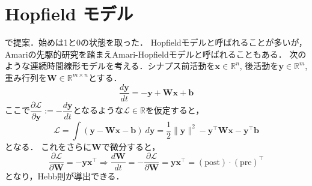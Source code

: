 \section{Hopfield モデル}\cite{Hopfield1982-vu}で提案．始めは1と0の状態を取った．
Hopfieldモデルと呼ばれることが多いが，Amariの先駆的研究\cite{Amari1972-fq}を踏まえAmari-Hopfieldモデルと呼ばれることもある．
次のような連続時間線形モデルを考える．シナプス前活動を$\mathbf{x}\in \mathbb{R}^n$, 後活動を$\mathbf{y}\in \mathbb{R}^m$, 重み行列を$\mathbf{W}\in \mathbb{R}^{m\times n}$とする．
$$
\frac{d\mathbf{y}}{dt}=-\mathbf{y}+\mathbf{W}\mathbf{x}+\mathbf{b}
$$
ここで$\dfrac{\partial\mathcal{L}}{\partial\mathbf{y}}:=-\dfrac{d\mathbf{y}}{dt}$となるような$\mathcal{L}\in \mathbb{R}$を仮定すると，
$$
\mathcal{L}=\int \left(\mathbf{y}-\mathbf{W}\mathbf{x}-\mathbf{b}\right)\ d\mathbf{y}=\frac{1}{2}\|\mathbf{y}\|^2-\mathbf{y}^\top \mathbf{W}\mathbf{x}-\mathbf{y}^\top \mathbf{b}
$$
となる． これをさらに$\mathbf{W}$で微分すると，
$$
\dfrac{\partial\mathcal{L}}{\partial\mathbf{W}}=-\mathbf{y}\mathbf{x}^\top\Rightarrow
\frac{d\mathbf{W}}{dt}=-\dfrac{\partial\mathcal{L}}{\partial\mathbf{W}}=\mathbf{y}\mathbf{x}^\top=(\text{post})\cdot (\text{pre})^\top
$$
となり，Hebb則が導出できる．
